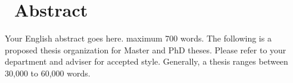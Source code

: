 \chapter*{\centering\ Abstract}
Your English abstract goes here. maximum 700 words.
The following is a proposed thesis organization for Master and PhD theses. Please refer to your department and adviser for accepted style. Generally, a thesis ranges between 30,000 to 60,000 words.
\lipsum[1-1]
